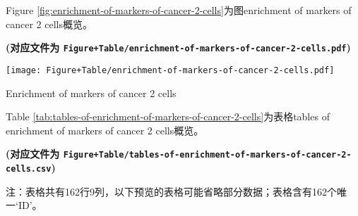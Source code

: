 \documentclass[
]{article}
\begin{document}
Figure \ref{fig:enrichment-of-markers-of-cancer-2-cells}为图enrichment of markers of cancer 2 cells概览。

\textbf{(对应文件为 \texttt{Figure+Table/enrichment-of-markers-of-cancer-2-cells.pdf})}

\def\@captype{figure}
\begin{center}
\texttt{[image: Figure+Table/enrichment-of-markers-of-cancer-2-cells.pdf]}
\caption{Enrichment of markers of cancer 2 cells}\label{fig:enrichment-of-markers-of-cancer-2-cells}
\end{center}

Table \ref{tab:tables-of-enrichment-of-markers-of-cancer-2-cells}为表格tables of enrichment of markers of cancer 2 cells概览。

\textbf{(对应文件为 \texttt{Figure+Table/tables-of-enrichment-of-markers-of-cancer-2-cells.csv})}

\begin{center}\begin{tcolorbox}[colback=gray!10, colframe=gray!50, width=0.9\linewidth, arc=1mm, boxrule=0.5pt]注：表格共有162行9列，以下预览的表格可能省略部分数据；表格含有162个唯一`ID'。
\end{tcolorbox}
\end{center}
\end{document}
